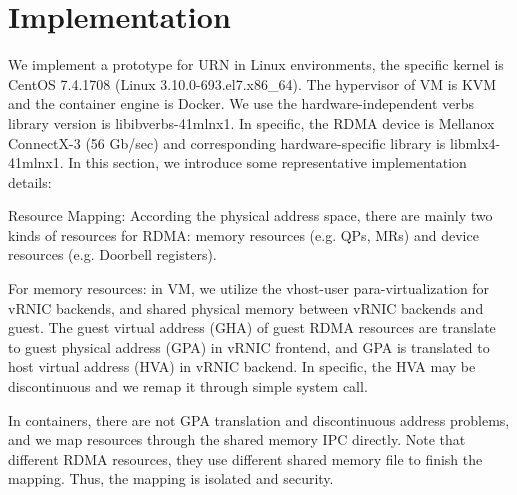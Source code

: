 \section{Implementation}
 We implement a prototype for URN in Linux environments, the specific kernel is CentOS 7.4.1708 (Linux 3.10.0-693.el7.x86\_64). The hypervisor of VM is KVM and the container engine is Docker. We use the hardware-independent verbs library version is libibverbs-41mlnx1. In specific, the RDMA device is Mellanox ConnectX-3 (56 Gb/sec) and corresponding hardware-specific library is libmlx4-41mlnx1. In this section, we introduce some representative implementation details:
 
 Resource Mapping: According the physical address space, there are mainly two kinds of resources for RDMA: memory resources (e.g. QPs, MRs) and device resources (e.g. Doorbell registers). 
 
 For memory resources: in VM, we utilize the vhost-user para-virtualization for vRNIC backends, and shared physical memory between vRNIC backends and guest. The guest virtual address (GHA) of guest RDMA resources are translate to guest physical address (GPA) in vRNIC frontend, and GPA is translated to host virtual address (HVA) in vRNIC backend. In specific, the HVA may be discontinuous and we remap it through simple system call.
 
 In containers, there are not GPA translation and discontinuous address problems, and we map resources through the shared memory IPC directly. Note that different RDMA resources, they use different shared memory file to finish the mapping. Thus, the mapping is isolated and security.
 
